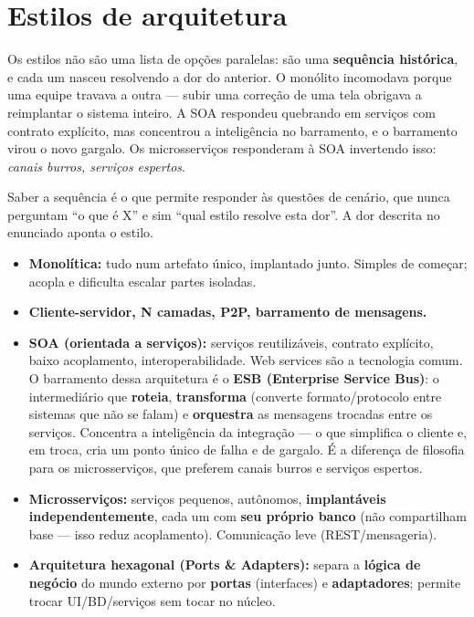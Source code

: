 \section{Estilos de arquitetura}

Os estilos não são uma lista de opções paralelas: são uma \textbf{sequência
histórica}, e cada um nasceu resolvendo a dor do anterior. O monólito
incomodava porque uma equipe travava a outra --- subir uma correção de uma tela
obrigava a reimplantar o sistema inteiro. A SOA respondeu quebrando em
serviços com contrato explícito, mas concentrou a inteligência no barramento,
e o barramento virou o novo gargalo. Os microsserviços responderam à SOA
invertendo isso: \emph{canais burros, serviços espertos}.

Saber a sequência é o que permite responder às questões de cenário, que nunca
perguntam ``o que é X'' e sim ``qual estilo resolve esta dor''. A dor descrita
no enunciado aponta o estilo.

\begin{conceito}
\begin{itemize}
\item \textbf{Monolítica:} tudo num artefato único, implantado junto.
Simples de começar; acopla e dificulta escalar partes isoladas.
\item \textbf{Cliente-servidor, N camadas, P2P, barramento de mensagens.}
\item \textbf{SOA (orientada a serviços):} serviços reutilizáveis, contrato
explícito, baixo acoplamento, interoperabilidade. Web services são a
tecnologia comum. O barramento dessa arquitetura é o \textbf{ESB (Enterprise
Service Bus)}: o intermediário que \textbf{roteia}, \textbf{transforma}
(converte formato/protocolo entre sistemas que não se falam) e
\textbf{orquestra} as mensagens trocadas entre os serviços. Concentra a
inteligência da integração --- o que simplifica o cliente e, em troca, cria um
ponto único de falha e de gargalo. É a diferença de filosofia para os
microsserviços, que preferem canais burros e serviços espertos.
\item \textbf{Microsserviços:} serviços pequenos, autônomos,
\textbf{implantáveis independentemente}, cada um com \textbf{seu próprio
banco} (não compartilham base --- isso reduz acoplamento). Comunicação leve
(REST/mensageria).
\item \textbf{Arquitetura hexagonal (Ports \& Adapters):} separa a
\textbf{lógica de negócio} do mundo externo por \textbf{portas} (interfaces)
e \textbf{adaptadores}; permite trocar UI/BD/serviços sem tocar no núcleo.
\end{itemize}
\end{conceito}


